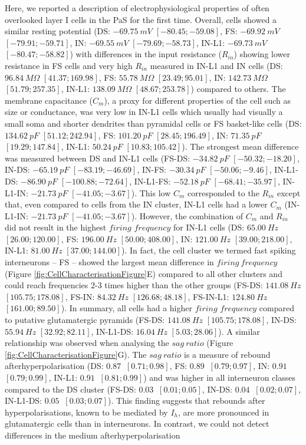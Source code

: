 \documentclass[
  12pt,
  a4paper,
  openany]{book}
\begin{document}
Here, we reported a description of electrophysiological properties of often overlooked layer I cells in the PaS for the first time. Overall, cells showed a similar resting potential (DS: \(-69.75\ mV\) \([-80.45; -59.08]\), FS: \(-69.92\ mV\) \([-79.91; -59.71]\), IN: \(-69.55\ mV\) \([-79.69; -58.73]\), IN-L1: \(-69.73\ mV\) \([-80.47; -58.82]\)) with differences in the input resistance (\(R_{in}\)) showing lower resistance in FS cells and very high \(R_{in}\) measured in IN-L1 and IN cells (DS: \(96.84\ M\Omega\) \([41.37; 169.98]\), FS: \(55.78\ M\Omega\) \([23.49; 95.01]\), IN: \(142.73\ M\Omega\) \([51.79; 257.35]\), IN-L1: \(138.09\ M\Omega\) \([48.67; 253.78]\)) compared to others. The membrane capacitance (\(C_{m}\)), a proxy for different properties of the cell such as size or conductance, was very low in IN-L1 cells which usually had visually a small soma and shorter dendrites than pyramidal cells or FS basket-like cells (DS: \(134.62\ pF\) \([51.12; 242.94]\), FS: \(101.20\ pF\) \([28.45; 196.49]\), IN: \(71.35\ pF\) \([19.29; 147.84]\), IN-L1: \(50.24\ pF\) \([10.83; 105.42]\)). The strongest mean difference was measured between DS and IN-L1 cells (FS-DS: \(-34.82\ pF\) \([-50.32; -18.20]\), IN-DS: \(-65.19\ pF\) \([-83.19; -46.69]\), IN-FS: \(-30.34\ pF\) \([-50.06; -9.46]\), IN-L1-DS: \(-86.90\ pF\) \([-100.88; -72.64]\), IN-L1-FS: \(-52.18\ pF\) \([-68.41; -35.97]\), IN-L1-IN: \(-21.73\ pF\) \([-41.05; -3.67]\)). This low \(C_{m}\) corresponded to the \(R_{in}\) except that, even compared to cells from the IN cluster, IN-L1 cells had a lower \(C_{m}\) (IN-L1-IN: \(-21.73\ pF\) \([-41.05; -3.67]\)). However, the combination of \(C_{m}\) and \(R_{in}\) did not result in the highest \(firing\) \(frequency\) for IN-L1 cells (DS: \(65.00\ Hz\) \([26.00; 120.00]\), FS: \(196.00\ Hz\) \([50.00; 408.00]\), IN: \(121.00\ Hz\) \([39.00; 218.00]\), IN-L1: \(81.00\ Hz\) \([37.00; 144.00]\)). In fact, the cell cluster we termed fast spiking interneurons -- FS -- showed the largest mean difference in \(firing\ frequency\) (Figure \ref{fig:CellCharacterisationFigure}E) compared to all other clusters and could reach frequencies \(2\)-\(3\) times higher than the other groups (FS-DS: \(141.08\ Hz\) \([105.75; 178.08]\), FS-IN: \(84.32\ Hz\) \([126.68; 48.18]\), FS-IN-L1: \(124.80\ Hz\) \([161.00; 89.50]\)). In summary, all cells had a higher \(firing\) \(frequency\) compared to putative glutamatergic pyramids (FS-DS: \(141.08\ Hz\) \([105.75; 178.08]\), IN-DS: \(55.94\ Hz\) \([32.92; 82.11]\), IN-L1-DS: \(16.04\ Hz\) \([5.03; 28.06]\)). A similar relationship was observed when analysing the \(sag\ ratio\) (Figure \ref{fig:CellCharacterisationFigure}G). The \(sag\ ratio\) is a measure of rebound afterhyperpolarisation (DS: \(0.87\ \) \([0.71; 0.98]\), FS: \(0.89\ \) \([0.79; 0.97]\), IN: \(0.91\ \) \([0.79; 0.99]\), IN-L1: \(0.91\ \) \([0.81; 0.99]\)) and was higher in all interneuron classes compared to the DS cluster (FS-DS: \(0.03\ \) \([0.01; 0.05]\), IN-DS: \(0.04\ \) \([0.02; 0.07]\), IN-L1-DS: \(0.05\ \) \([0.03; 0.07]\)). This finding suggests that rebounds after hyperpolarisations, known to be mediated by \(I_{h}\), are more pronounced in glutamatergic cells than in interneurons. In contrast, we could not detect differences in the medium afterhyperpolarisation 
\end{document}
